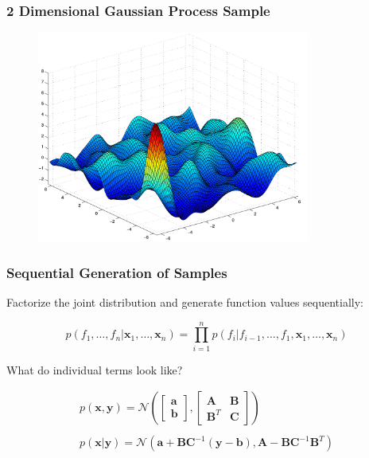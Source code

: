 \documentclass[10pt]{beamer}
\newcommand{\bx}{\mathbf{x}}
\newcommand{\by}{\mathbf{y}}
\newcommand{\ba}{\mathbf{a}}
\newcommand{\bb}{\mathbf{b}}
\newcommand{\bA}{\mathbf{A}}
\newcommand{\bB}{\mathbf{B}}
\newcommand{\bC}{\mathbf{C}}
\newcommand{\gaussN}{\mathcal{N}}
\begin{document}
  \begin{frame}
    \frametitle{2 Dimensional Gaussian Process Sample}

    \begin{figure}
      \centering
      \includegraphics[width=0.8\textwidth]{gpSample2.png}
    \end{figure}
  \end{frame}

  \begin{frame}
    \frametitle{Sequential Generation of Samples}
    Factorize the joint distribution and generate function values sequentially:

    \begin{equation*}
      p(f_1,\dots,f_n|\bx_1,\dots,\bx_n) = \prod_{i=1}^{n} p(f_i|f_{i-1},\dots,f_1,\bx_1,\dots,\bx_n)
    \end{equation*}

    \pause

    What do individual terms look like?

    \begin{equation*}
      \begin{array}{c}
        p(\bx,\by) = \gaussN\left(\begin{bmatrix} \ba \\ \bb \end{bmatrix}, \begin{bmatrix} \bA & \bB \\ \bB^T & \bC \end{bmatrix} \right) \\~\\
        p(\bx|\by) = \gaussN(\ba + \bB \bC^{-1} (\by-\bb), \bA - \bB
         \bC^{-1}\bB^T)
      \end{array}
    \end{equation*}
  \end{frame}
\end{document}
